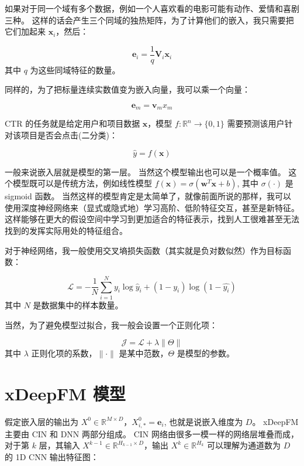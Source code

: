 \documentclass[degree=project,degree-type=project,cjk-font=noto]{thuthesis}
\begin{document}
如果对于同一个域有多个数据，例如一个人喜欢看的电影可能有动作、爱情和喜剧三种。
这样的话会产生三个同域的独热矩阵，为了计算他们的嵌入，我只需要把它们加起来 $\bm{x}_i$，然后：

\begin{equation}
  \bm{e}_i = \frac{1}{q} \bm{V}_i \bm{x}_i
\end{equation}
其中 $q$ 为这些同域特征的数量。

同样的，为了把标量连续实数值变为嵌入向量，我可以乘一个向量：

\begin{equation}
  \bm{e}_m = \bm{v}_m x_m
\end{equation}


CTR 的任务就是给定用户和项目数据 $\symbf{x}$，模型 $f: \mathbb{R}^n \rightarrow \{0, 1\}$ 需要预测该用户针对该项目是否会点击(二分类)：

\begin{equation}
  \hat{y} = f(\symbf{x})
\end{equation}

一般来说嵌入层就是模型的第一层。
当然这个模型输出也可以是一个概率值。
这个模型既可以是传统方法，例如线性模型 $f(\symbf{x}) = \sigma(\symbf{w}^T \symbf{x} + b)$, 其中 $\sigma(\cdot)$ 是 sigmoid 函数。
当然这样的模型肯定是太简单了，就像前面所说的那样，我可以使用深度神经网络来（显式或隐式地）学习高阶、低阶特征交互，甚至是新特征。
这样能够在更大的假设空间中学习到更加适合的特征表示，找到人工很难甚至无法找到的发挥实际用处的特征组合。

对于神经网络，我一般使用交叉墒损失函数（其实就是负对数似然）作为目标函数：

\begin{equation}
  \mathcal{L} = - \frac{1}{N} \sum_{i=1}^N y_i \log \hat{y}_i + (1 - y_i) \log (1 - \hat{y_i})
\end{equation}
其中 $N$ 是数据集中的样本数量。

当然，为了避免模型过拟合，我一般会设置一个正则化项：

\begin{equation}
  \mathcal{J} = \mathcal{L} + \lambda \lVert \Theta \rVert
\end{equation}
其中 $\lambda$ 正则化项的系数，$\lVert \cdot \rVert$ 是某中范数，$\Theta$ 是模型的参数。

\section{xDeepFM 模型}

假定嵌入层的输出为 $X^0 \in \mathbb{R}^{M \times D}$，$X^0_{i,*} = \bm{e}_i$, 也就是说嵌入维度为 $D$。
xDeepFM 主要由 CIN 和 DNN 两部分组成。
CIN 网络由很多一模一样的网络层堆叠而成，对于第 $k$ 层，其输入 $X^{k-1} \in \mathbb{R}^{H_{k-1} \times D}$，输出 $X^k \in \mathbb{R}^{H_k}$ 可以理解为通道数为 $D$ 的 1D CNN 输出特征图：
\end{document}
